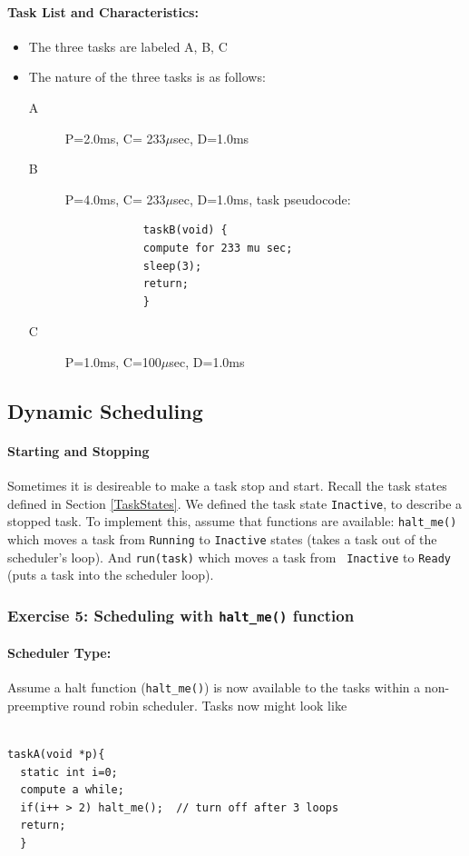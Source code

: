 \documentclass{article}	%
\begin{document}
\paragraph{Task List and Characteristics:} 
\begin{itemize}
\item The three tasks are labeled A, B, C
\item The nature of the three tasks is as follows:
    \begin{description}
      \item [A] P=2.0ms, C= 233$\mu$sec, D=1.0ms
      \item [B] P=4.0ms, C= 233$\mu$sec, D=1.0ms, task pseudocode: 
\begin{verbatim}
            taskB(void) {
            compute for 233 mu sec;
            sleep(3);
            return;
            }
\end{verbatim}
      \item [C]  P=1.0ms, C=100$\mu$sec, D=1.0ms  
    \end{description}
\end{itemize}






\subsection*{Dynamic Scheduling}

\paragraph{Starting and Stopping}
Sometimes it is desireable to make a task stop and start. Recall the task states defined in 
Section \ref{TaskStates}.  We defined the
task state {\tt Inactive}, to describe a stopped task.  To implement
this, assume
that functions are available: {\tt halt\_me()} which moves a task from
{\tt Running} to
{\tt Inactive} states (takes a task out of the
scheduler's loop).  And {\tt run(task)} which moves a task from {\tt
Inactive} to {\tt Ready} (puts a task into the
scheduler loop).



\subsubsection{Exercise 5: Scheduling with {\tt halt\_me()} function}

\paragraph{Scheduler Type:} Assume a halt function ({\tt halt\_me()}) is now available to the tasks within a non-preemptive round robin scheduler.   Tasks now might look like
\begin{verbatim}

taskA(void *p){
  static int i=0;
  compute a while;
  if(i++ > 2) halt_me();  // turn off after 3 loops
  return;
  }
\end{verbatim} 
\end{document}
